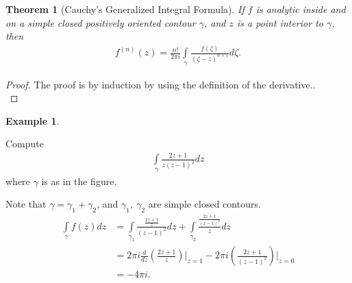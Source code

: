 \documentclass[12pt, a4paper]{article}
\theoremstyle{plain}
\newtheorem{thm}{Theorem} %
\theoremstyle{definition}
\newtheorem{example}{Example} %
\begin{document}
		\begin{thm}[Cauchy's Generalized Integral Formula]
			If $f$ is analytic inside and on a simple closed positively oriented contour $\gamma$, and $z$ is a point interior to $\gamma$, then
			\begin{align*}
				f^{(n)}(z) = \frac{n!}{2\pi i}\int\limits_{\gamma}\frac{f(\zeta)}{(\zeta-z)^{n+1}}d \zeta.
			\end{align*}
		\end{thm}

		\begin{proof}
			The proof is by induction by using the definition of the derivative..\\
		\end{proof}

		\begin{example}
			\begin{multicols}{2}
				Compute
				\begin{align*}
					\int\limits_{\gamma}\frac{2z+1}{z(z-1)^2}dz
				\end{align*}
				where $\gamma$ is as in the figure.
				\begin{figure}[H]
					\flushright
				\end{figure}
			\end{multicols}
			Note that $\gamma=\gamma_1+\gamma_2$, and $\gamma_1,\:\gamma_2$ are simple closed contours.
			\begin{align*}
				\int\limits_{\gamma}f(z)dz &= 
				\int\limits_{\gamma_1}\frac{\frac{2z+1}{z}}{(z-1)^2}dz + 
				\int\limits_{\gamma_2}\frac{\frac{2z+1}{(z-1)^2}}{z}dz \\ &=
				2\pi i \frac{d}{dz}\left(\frac{2z+1}{z}\right)\Bigg|_{z=1} - 
				2\pi i \left(\frac{2z+1}{(z-1)^2}\right)\Bigg|_{z=0} \\ &=
				-4\pi i.\\
			\end{align*}
		\end{example}
\end{document}

